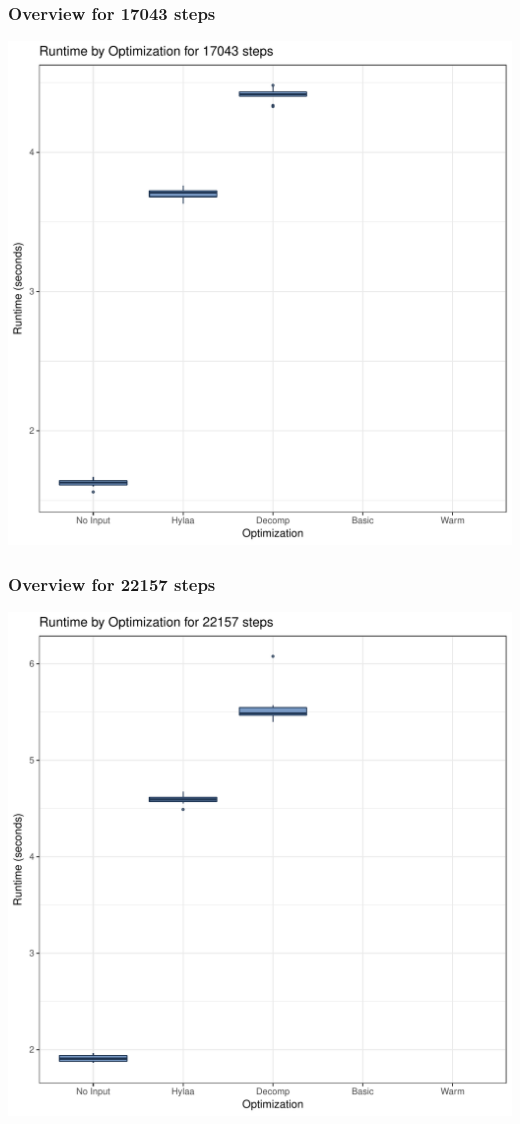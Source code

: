 \documentclass{article}\usepackage[]{graphicx}\usepackage[]{color}
\makeatletter
\def\maxwidth{ %
  \ifdim\Gin@nat@width>\linewidth
    \linewidth
  \else
    \Gin@nat@width
  \fi
}
\newenvironment{knitrout}{}{} %
\makeatother
\begin{document}
\subsubsection{Overview for 17043 steps}
\begin{knitrout}
\color{fgcolor}
\includegraphics[width=\maxwidth]{figure/steps17043-1} 

\end{knitrout}
\subsubsection{Overview for 22157 steps}
\begin{knitrout}
\color{fgcolor}
\includegraphics[width=\maxwidth]{figure/steps22157-1} 

\end{knitrout}
\end{document}
